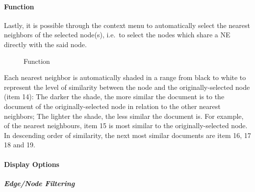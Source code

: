 \paragraph{ Function}
Lastly, it is possible through the context menu to automatically select the nearest neighbors of the selected node(s), i.e.\ to select the nodes which share a NE directly with the said node.

\begin{figure}[ht]
\centering
\caption{ Function}
\end{figure}

Each nearest neighbor is automatically shaded in a range from black to white to represent the level of similarity between the node and the originally-selected node (item 14): The darker the shade, the more similar the document is to the document of the originally-selected node in relation to the other nearest neighbors; The lighter the shade, the less similar the document is. For example, of the nearest neighbours, item 15 is most similar to the originally-selected node. In descending order of similarity, the next most similar documents are item 16, 17 18 and 19.

\paragraph{Display Options}
\subparagraph{Edge/Node Filtering}

